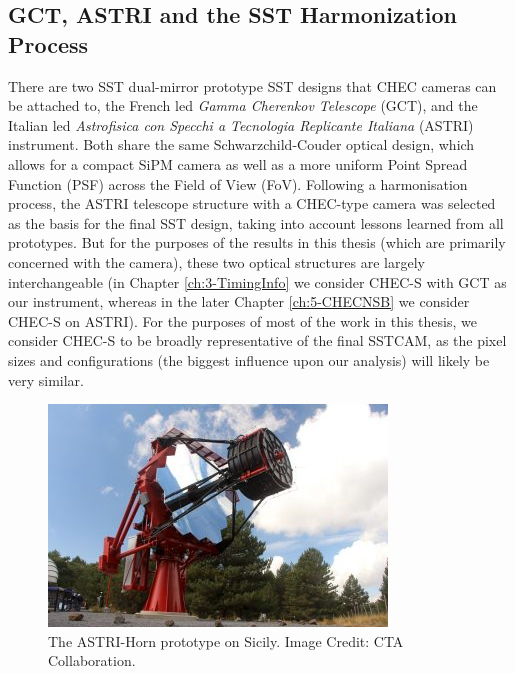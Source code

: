 \subsection{GCT, ASTRI and the SST Harmonization Process}

There are two SST dual-mirror prototype SST designs that CHEC cameras can be attached to, the French led \textit{Gamma Cherenkov Telescope} (GCT), and the Italian led \textit{Astrofisica con Specchi a Tecnologia Replicante Italiana} (ASTRI) instrument. Both share the same Schwarzchild-Couder optical design, which allows for a compact SiPM camera as well as a more uniform Point Spread Function (PSF) across the Field of View (FoV). Following a harmonisation process, the ASTRI telescope structure with a CHEC-type camera was selected as the basis for the final SST design, taking into account lessons learned from all prototypes. But for the purposes of the results in this thesis (which are primarily concerned with the camera), these two optical structures are largely interchangeable (in Chapter \ref{ch:3-TimingInfo} we consider CHEC-S with GCT as our instrument, whereas in the later Chapter \ref{ch:5-CHECNSB} we consider CHEC-S on ASTRI). For the purposes of most of the work in this thesis, we consider CHEC-S to be broadly representative of the final SSTCAM, as the pixel sizes and configurations (the biggest influence upon our analysis) will likely be very similar.

\begin{figure}[ht] 
        \centering \includegraphics[width=\columnwidth]{figures/astri-horn.jpg}
        \caption{
                \label{fig:astri} %
                The ASTRI-Horn prototype on Sicily. Image Credit: CTA Collaboration.
        }
\end{figure}


